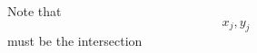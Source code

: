\documentclass[preview]{standalone}
\begin{document}
\begin{center}
Note that $$x_j, y_j$$ must be the intersection
\end{center}
\end{document}
